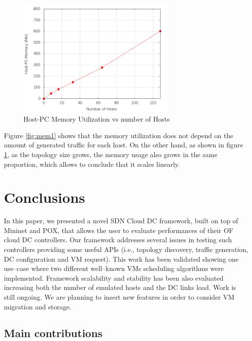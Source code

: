\documentclass[12pt,english,oneside]{book}
\begin{document}
\begin{figure}[h!tbp]
        \centering
        \includegraphics[width=0.7\textwidth]{figures/mem2_utilization.png}
        \caption{Host-PC Memory Utilization vs number of Hosts}
        \label{fig:mem2}
\end{figure}

Figure \ref{fig:mem1} shows that the memory utilization does not depend on the amount of generated traffic for each host.
On the other hand, as shown in figure \ref{fig:mem2}, as the topology size grows, the memory usage also grows in the same proportion, which allows to conclude that it scales linearly.
\newpage

\chapter{Conclusions\label{cha:conclusions}}

In this paper, we presented a novel SDN Cloud DC framework, built on top of Mininet and POX, that allows the user to evaluate performances of their OF cloud DC controllers. Our framework addresses several issues in testing such controllers providing some useful APIs (i.e., topology discovery, traffic generation, DC configuration and VM request). This work has been validated showing one use--case where two different well--known VMs scheduling algorithms were implemented. Framework scalability and stability has been also evaluated increasing both the number of emulated hosts and the DC links load. Work is still ongoing. We are planning to insert new features in order to consider VM migration and storage.

\section{Main contributions}
\end{document}
